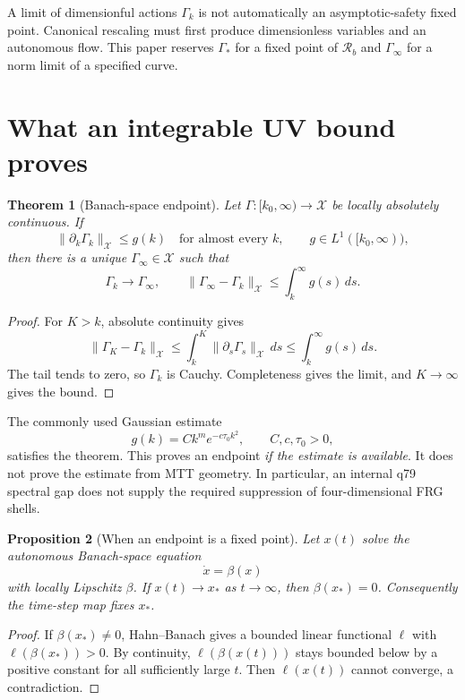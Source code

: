 \documentclass[11pt]{article}
\newtheorem{theorem}{Theorem}[section]
\newtheorem{proposition}[theorem]{Proposition}
\theoremstyle{definition}
\theoremstyle{remark}
\newcommand{\X}{\mathcal X}
\newcommand{\Rmap}{\mathcal R}
\begin{document}
A limit of dimensionful actions \(\Gamma_k\) is not automatically an
asymptotic-safety fixed point. Canonical rescaling must first produce
dimensionless variables and an autonomous flow. This paper reserves
\(\Gamma_\ast\) for a fixed point of \(\Rmap_b\) and
\(\Gamma_\infty\) for a norm limit of a specified curve.

\section{What an integrable UV bound proves}

\begin{theorem}[Banach-space endpoint]
\label{thm:endpoint}
Let \(\Gamma:[k_0,\infty)\to\X\) be locally absolutely continuous. If
\[
 \|\partial_k\Gamma_k\|_{\X}\leq g(k)
 \quad\text{for almost every }k,
 \qquad
 g\in L^1([k_0,\infty)),
\]
then there is a unique \(\Gamma_\infty\in\X\) such that
\[
 \Gamma_k\longrightarrow\Gamma_\infty,
 \qquad
 \|\Gamma_\infty-\Gamma_k\|_{\X}
 \leq\int_k^\infty g(s)\,ds.
\]
\end{theorem}

\begin{proof}
For \(K>k\), absolute continuity gives
\[
 \|\Gamma_K-\Gamma_k\|_{\X}
 \leq\int_k^K\|\partial_s\Gamma_s\|_{\X}\,ds
 \leq\int_k^\infty g(s)\,ds.
\]
The tail tends to zero, so \(\Gamma_k\) is Cauchy. Completeness gives the
limit, and \(K\to\infty\) gives the bound.
\end{proof}

The commonly used Gaussian estimate
\[
 g(k)=Ck^m e^{-c\tau_0k^2},
 \qquad C,c,\tau_0>0,
\]
satisfies the theorem. This proves an endpoint \emph{if the estimate is
available}. It does not prove the estimate from MTT geometry. In particular,
an internal q79 spectral gap does not supply the required suppression of
four-dimensional FRG shells.

\begin{proposition}[When an endpoint is a fixed point]
\label{prop:endpoint-fixed}
Let \(x(t)\) solve the autonomous Banach-space equation
\[
 \dot x=\beta(x)
\]
with locally Lipschitz \(\beta\). If \(x(t)\to x_\ast\) as
\(t\to\infty\), then \(\beta(x_\ast)=0\). Consequently the time-step map
fixes \(x_\ast\).
\end{proposition}

\begin{proof}
If \(\beta(x_\ast)\neq0\), Hahn--Banach gives a bounded linear functional
\(\ell\) with \(\ell(\beta(x_\ast))>0\). By continuity,
\(\ell(\beta(x(t)))\) stays bounded below by a positive constant for all
sufficiently large \(t\). Then \(\ell(x(t))\) cannot converge, a
contradiction.
\end{proof}
\end{document}
